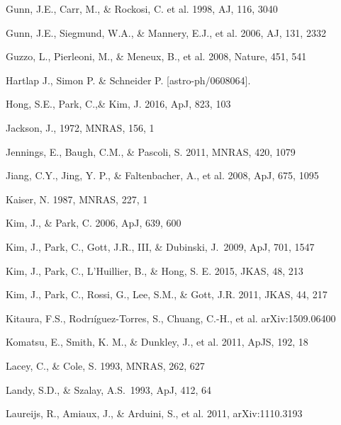 \documentclass[useAMS,usenatbib]{mnras}
\begin{document}
\begin{thebibliography}{}
Gunn, J.E., Carr, M., \& Rockosi, C. et al. 1998, AJ, 116, 3040

Gunn, J.E., Siegmund, W.A., \& Mannery, E.J., et al. 2006, AJ, 131, 2332

Guzzo, L., Pierleoni, M., \& Meneux, B., et al. 2008, Nature, 451, 541

Hartlap J., Simon P. \& Schneider P. [astro-ph/0608064].


Hong, S.E., Park, C.,\&  Kim, J. 2016, ApJ, 823, 103

Jackson, J., 1972, MNRAS, 156, 1

Jennings, E., Baugh, C.M., \& Pascoli, S. 2011, MNRAS, 420, 1079  


Jiang, C.Y., Jing, Y. P., \& Faltenbacher, A., et al. 2008, ApJ, 675, 1095

Kaiser, N. 1987, MNRAS, 227, 1


Kim, J., \& Park, C. 2006, ApJ, 639, 600  

Kim, J., Park, C., Gott, J.R., III, \& Dubinski, J.\ 2009, ApJ, 701, 1547 

Kim, J., Park, C., L'Huillier, B., \& Hong, S. E. 2015, JKAS, 48, 213

Kim, J., Park, C., Rossi, G., Lee, S.M., \& Gott, J.R. 2011, JKAS, 44, 217  

Kitaura, F.S., Rodrı\'{i}guez-Torres, S., Chuang, C.-H., et al. arXiv:1509.06400

Komatsu, E., Smith, K. M., \& Dunkley, J., et al. 2011, ApJS, 192, 18  

Lacey, C., \& Cole, S. 1993, MNRAS, 262, 627


Landy, S.D., \& Szalay, A.S.\ 1993, ApJ, 412, 64 

Laureijs, R., Amiaux, J., \& Arduini, S., et al. 2011, arXiv:1110.3193


\end{thebibliography}
\end{document}
